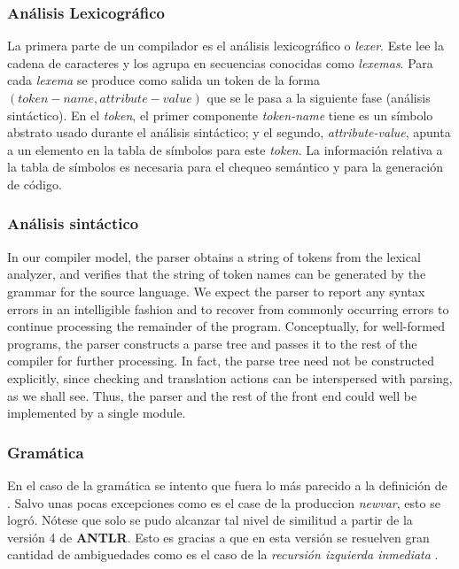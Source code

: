 \documentclass[]{article}
\begin{document}
		\subsubsection{Análisis Lexicográfico}\label{sec:alex}
			La primera parte de un compilador es el análisis lexicográfico o \textit{lexer}. Este lee la cadena de caracteres y los agrupa en secuencias conocidas como \textit{lexemas}. Para cada \textit{lexema} se produce como salida un token de la forma $(token-name, attribute-value)$ que se le pasa a la siguiente fase (análisis sintáctico). En el \textit{token}, el primer componente \textit{token-name} tiene es un símbolo abstrato usado durante el análisis sintáctico; y el segundo, \textit{attribute-value}, apunta a un elemento en la tabla de símbolos para este \textit{token}. La información relativa a la tabla de símbolos es necesaria para el chequeo semántico y para la generación de código.

		\subsubsection{Análisis sintáctico}\label{sec:asin}
			In our compiler model, the parser obtains a string of tokens from the lexical analyzer, and verifies that the string of token names can be generated by the grammar for the source language. We expect the parser to report any syntax errors in an intelligible fashion and to recover from commonly occurring errors to continue processing the remainder of the program. Conceptually, for well-formed programs, the parser constructs a parse tree and passes it to the rest of the compiler for further processing. In fact, the parse tree need not be constructed explicitly, since checking and translation actions can be interspersed with parsing, as we shall see. Thus, the parser and the rest of the front end could well be implemented by a single module.

		\subsubsection{Gramática}\label{sec:gram}
			En el caso de la gramática se intento que fuera lo más parecido a la definición de \cite{aiken}. Salvo unas pocas excepciones como es el case de la produccion \textit{newvar}, esto se logró. Nótese que solo se pudo alcanzar tal nivel de similitud a partir de la versión 4 de \textbf{ANTLR}. Esto es gracias a que en esta versión se resuelven gran cantidad de ambiguedades como es el caso de la \textit{recursión izquierda inmediata} \cite{antlr}.
\end{document}
